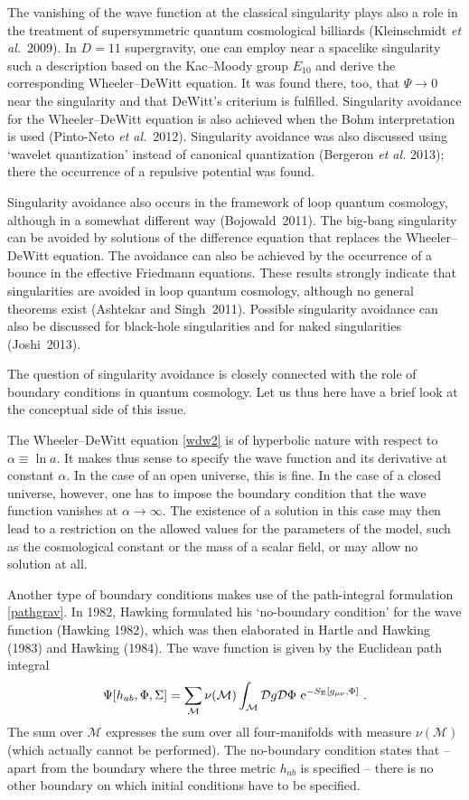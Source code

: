 \documentclass[12pt]{article}
\newcommand{\be}{\begin{equation}}
\newcommand{\ee}{\end{equation}}
\newcommand{\lb}{\label}
\newcommand{\E}{{\rm e}}
\begin{document}
The vanishing of the wave function at the classical singularity plays
also a role in the treatment of
supersymmetric quantum cosmological billiards (Kleinschmidt {\em et
  al.}~2009). In $D=11$ supergravity, one can employ near
a spacelike singularity such a description based on the
Kac--Moody group $E_{10}$ and derive the corresponding
Wheeler--DeWitt equation. It was found there, too, that 
$\Psi\to 0$ near the singularity and that DeWitt's criterium is
fulfilled. Singularity avoidance for the Wheeler--DeWitt equation is
also achieved when the Bohm interpretation is used (Pinto-Neto {\em et
  al.}~2012). Singularity avoidance was also discussed using `wavelet
quantization' instead of canonical quantization (Bergeron {\em et al.}
2013); there the occurrence of a repulsive potential was found. 
 
Singularity avoidance also occurs in the framework of
loop quantum cosmology, although in a somewhat different way
(Bojowald~2011). The big-bang singularity can be avoided by solutions
of the difference equation that replaces the Wheeler--DeWitt
equation. The avoidance can also be achieved by the occurrence of a
bounce in the effective Friedmann equations. These results strongly
indicate that singularities are avoided in loop quantum
cosmology, although no general theorems exist (Ashtekar and
Singh~2011). Possible singularity avoidance can also be discussed for
black-hole singularities and for naked singularities (Joshi~2013). 

The question of singularity avoidance is closely connected with the
role of boundary conditions in quantum cosmology. Let us thus here
have a brief look at the conceptual side of this issue.

The Wheeler--DeWitt equation \eqref{wdw2} is of hyperbolic nature with
respect to $\alpha\equiv \ln a$. It makes thus sense to specify the wave
function and its derivative at constant $\alpha$. In the case of an
open universe, this is fine. In the case of a closed universe,
however, one has to impose the boundary condition that the wave
function vanishes at $\alpha\to\infty$. The existence of a
solution in this case may then lead to a restriction on the allowed
values for the parameters of the model, such as the cosmological
constant or the mass of a scalar field, or may allow no solution at all. 

Another type of boundary conditions makes use of the path-integral
formulation \eqref{pathgrav}. In 1982, Hawking formulated his
`no-boundary condition' for the wave function (Hawking 1982), which
was then elaborated in Hartle and Hawking (1983) and Hawking (1984). 
The wave function is given by the Euclidean path integral
\be
\lb{8.3.1}
\Psi[h_{ab},\Phi,\Sigma]=\sum_{\mathcal M}\nu({\mathcal M})
\int_{\mathcal M}{\mathcal D}g{\mathcal D}\Phi\
\E^{-S_{\rm E}[g_{\mu\nu},\Phi]}\ .
\ee
The sum over $ {\mathcal M}$ expresses the sum over all four-manifolds
with measure $\nu({\mathcal M})$ (which actually cannot be
performed). The no-boundary condition states 
that -- apart from the boundary where the three metric $h_{ab}$ is
specified -- there is no other boundary on which initial
conditions have to be specified. 
\end{document}
